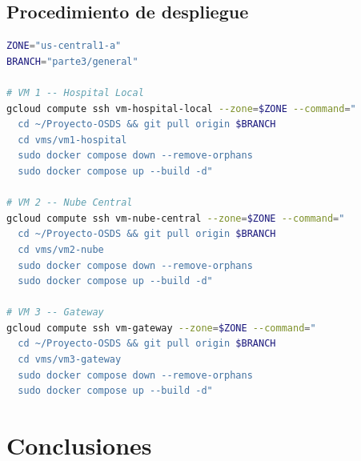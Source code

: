 \documentclass[11pt,a4paper]{article}
\begin{document}
\subsection{Procedimiento de despliegue}

\begin{lstlisting}[language=bash, caption=Script de despliegue automatizado en GCP]
ZONE="us-central1-a"
BRANCH="parte3/general"

# VM 1 -- Hospital Local
gcloud compute ssh vm-hospital-local --zone=$ZONE --command="
  cd ~/Proyecto-OSDS && git pull origin $BRANCH
  cd vms/vm1-hospital
  sudo docker compose down --remove-orphans
  sudo docker compose up --build -d"

# VM 2 -- Nube Central
gcloud compute ssh vm-nube-central --zone=$ZONE --command="
  cd ~/Proyecto-OSDS && git pull origin $BRANCH
  cd vms/vm2-nube
  sudo docker compose down --remove-orphans
  sudo docker compose up --build -d"

# VM 3 -- Gateway
gcloud compute ssh vm-gateway --zone=$ZONE --command="
  cd ~/Proyecto-OSDS && git pull origin $BRANCH
  cd vms/vm3-gateway
  sudo docker compose down --remove-orphans
  sudo docker compose up --build -d"
\end{lstlisting}

\section{Conclusiones}
\end{document}
